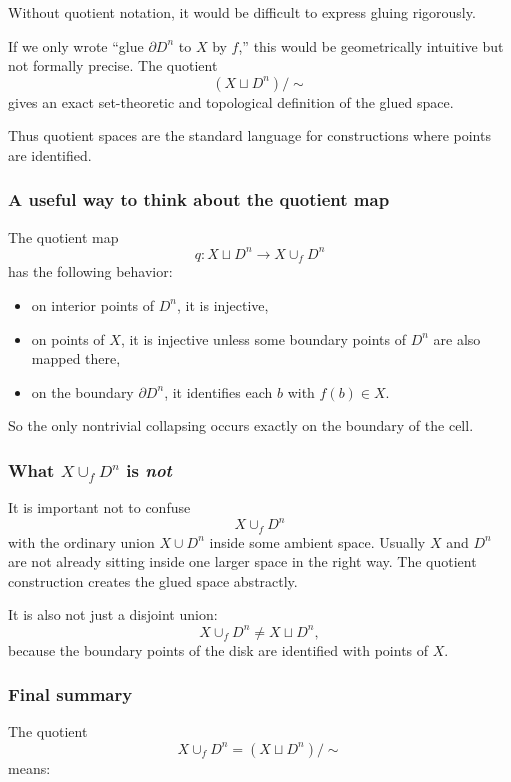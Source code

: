 \documentclass[12pt,a4paper]{article}
\theoremstyle{notespace}
\begin{document}
Without quotient notation, it would be difficult to express gluing rigorously.

If we only wrote ``glue \(\partial D^n\) to \(X\) by \(f\),'' this would be geometrically intuitive but not formally precise. The quotient
\[
(X\sqcup D^n)/\sim
\]
gives an exact set-theoretic and topological definition of the glued space.

Thus quotient spaces are the standard language for constructions where points are identified.

\subsubsection{A useful way to think about the quotient map}

The quotient map
\[
q:X\sqcup D^n\to X\cup_f D^n
\]
has the following behavior:

\begin{itemize}
	\item on interior points of \(D^n\), it is injective,
	\item on points of \(X\), it is injective unless some boundary points of \(D^n\) are also mapped there,
	\item on the boundary \(\partial D^n\), it identifies each \(b\) with \(f(b)\in X\).
\end{itemize}

So the only nontrivial collapsing occurs exactly on the boundary of the cell.

\subsubsection{What \(X\cup_f D^n\) is \emph{not}}

It is important not to confuse
\[
X\cup_f D^n
\]
with the ordinary union \(X\cup D^n\) inside some ambient space. Usually \(X\) and \(D^n\) are not already sitting inside one larger space in the right way. The quotient construction creates the glued space abstractly.

It is also not just a disjoint union:
\[
X\cup_f D^n \neq X\sqcup D^n,
\]
because the boundary points of the disk are identified with points of \(X\).

\subsubsection{Final summary}

The quotient
\[
X\cup_f D^n=(X\sqcup D^n)/\sim
\]
means:
\end{document}
